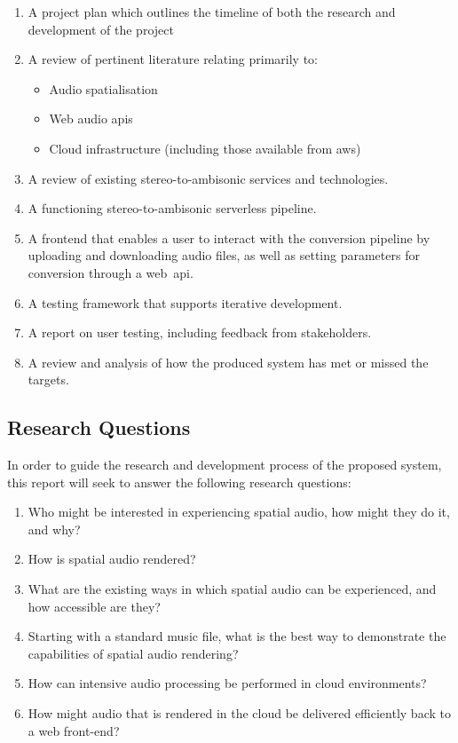 \begin{enumerate}
    \item A project plan which outlines the timeline of both the research and development of the project
    \item A review of pertinent literature relating primarily to:
    \begin{itemize}
        \item Audio spatialisation
        \item Web audio \glspl{api}
        \item Cloud infrastructure (including those available from \gls{aws})
    \end{itemize}
    \item A review of existing stereo-to-ambisonic services and technologies.
    \item A functioning stereo-to-ambisonic serverless pipeline.
    \item A frontend that enables a user to interact with the conversion pipeline by uploading and downloading audio files, as well as setting parameters for conversion through a web~\gls{api}.
    \item A testing framework that supports iterative development.
    \item A report on user testing, including feedback from stakeholders.
    \item A review and analysis of how the produced system has met or missed the targets.
\end{enumerate}

\subsection{Research Questions}\label{subsec:research-questions}

In order to guide the research and development process of the proposed system, this report will seek to answer the following research questions:

\begin{enumerate}
    \item Who might be interested in experiencing spatial audio, how might they do it, and why?
    \item How is spatial audio rendered?
    \item What are the existing ways in which spatial audio can be experienced, and how accessible are they?
    \item Starting with a standard music file, what is the best way to demonstrate the capabilities of spatial audio rendering?
    \item How can intensive audio processing be performed in cloud environments?
    \item How might audio that is rendered in the cloud be delivered efficiently back to a web front-end?

\end{enumerate}